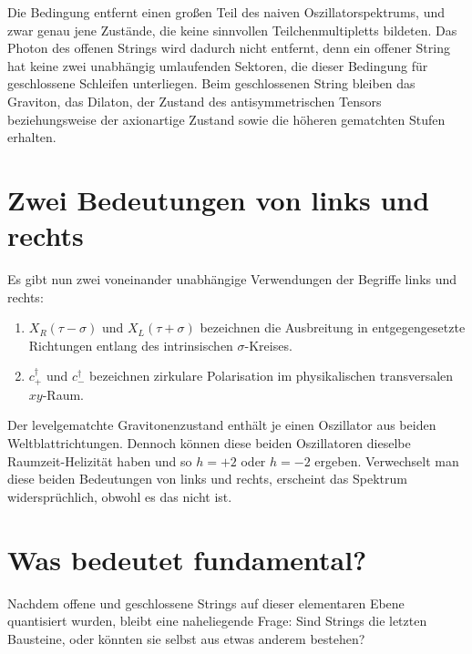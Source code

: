 Die Bedingung entfernt einen großen Teil des naiven Oszillatorspektrums, und zwar genau jene Zustände, die keine sinnvollen Teilchenmultipletts bildeten. Das Photon des offenen Strings wird dadurch nicht entfernt, denn ein offener String hat keine zwei unabhängig umlaufenden Sektoren, die dieser Bedingung für geschlossene Schleifen unterliegen. Beim geschlossenen String bleiben das Graviton, das Dilaton, der Zustand des antisymmetrischen Tensors beziehungsweise der axionartige Zustand sowie die höheren gematchten Stufen erhalten. 

\section{Zwei Bedeutungen von links und rechts}

Es gibt nun zwei voneinander unabhängige Verwendungen der Begriffe links und rechts:
\begin{enumerate}
  \item \(X_R(\tau-\sigma)\) und \(X_L(\tau+\sigma)\) bezeichnen die Ausbreitung in entgegengesetzte Richtungen entlang des intrinsischen \(\sigma\)-Kreises.
  \item \(c_+^\dagger\) und \(c_-^\dagger\) bezeichnen zirkulare Polarisation im physikalischen transversalen \(xy\)-Raum.
\end{enumerate}
Der levelgematchte Gravitonenzustand enthält je einen Oszillator aus beiden Weltblattrichtungen. Dennoch können diese beiden Oszillatoren dieselbe Raumzeit-Helizität haben und so \(h=+2\) oder \(h=-2\) ergeben. Verwechselt man diese beiden Bedeutungen von links und rechts, erscheint das Spektrum widersprüchlich, obwohl es das nicht ist.

\section{Was bedeutet fundamental?}

Nachdem offene und geschlossene Strings auf dieser elementaren Ebene quantisiert wurden, bleibt eine naheliegende Frage: Sind Strings die letzten Bausteine, oder könnten sie selbst aus etwas anderem bestehen?

\begin{classroomqa}
\end{classroomqa}

